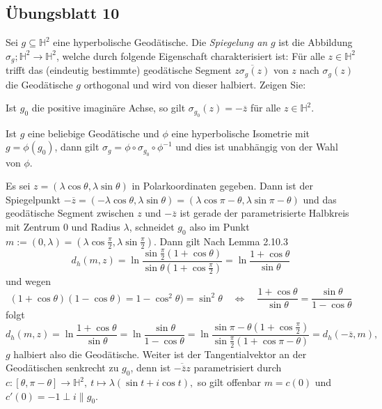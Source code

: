 \documentclass[11pt]{book}
\numberwithin{dummy}{section}
\theoremstyle{nonumberbreak}
\newenvironment{prob}[1][]{\ifthenelse{\equal{#1}{}}{\problem}{\problem[#1]}\rm}{\endproblem}
\newenvironment{sol}[1][]{\ifthenelse{\equal{#1}{}}{\solution}{\solution[#1]}\rm}{\endsolution}
\newcommand{\He}{\mathbb{H}}
\newcommand{\la}{\longrightarrow}
\begin{document}
\begin{spacing}{1.4}
\titlespacing*{\section}{-16.5pt}{0pt}{20pt}
\renewcommand*\thesection{}
\section{Übungsblatt 10} %
\renewcommand*\thesection{\arabic{section}}



\begin{prob}    %

Sei $g \subseteq \He^2$ eine hyperbolische Geodätische. Die \textit{Spiegelung an} $g$ ist die Abbildung $\sigma_g; \He^2 \la \He^2$, welche durch folgende Eigenschaft charakterisiert ist: Für alle $z \in \He^2$ trifft das (eindeutig bestimmte) geodätische Segment $\overline{z \sigma_g(z)}$ von $z$ nach $\sigma_g(z)$ die Geodätische $g$ orthogonal und wird von dieser halbiert. Zeigen Sie:
\begin{compactenum}
\item Ist $g_0$ die positive imaginäre Achse, so gilt $\sigma_{g_0}(z)=-\overline{z}$ für alle $z \in \He^2$.
\item Ist $g$ eine beliebige Geodätische und $\phi$ eine hyperbolische Isometrie mit $g=\phi(g_0)$, dann gilt $\sigma_g= \phi \circ \sigma_{g_0}\circ \phi^{-1}$ und dies ist unabhängig von der Wahl von $\phi$.
\end{compactenum}


\begin{sol}
\begin{compactenum}
\item Es sei $z=(\lambda \cos \theta, \lambda \sin \theta)$ in Polarkoordinaten gegeben. Dann ist der Spiegelpunkt $-\overline{z} = (-\lambda \cos \theta, \lambda \sin \theta)= (\lambda \cos \pi- \theta, \lambda \sin \pi-\theta)$ und das geodätische Segment zwischen $z$ und $-\overline{z}$ ist gerade der parametrisierte Halbkreis mit Zentrum $0$ und Radius $\lambda$, schneidet $g_0$ also im Punkt $m:=(0,\lambda) = \left(\lambda \cos \frac{\pi}{2}, \lambda \sin \frac{\pi}{2}\right)$. Dann gilt Nach Lemma 2.10.3
$$d_h(m,z)=\ln \frac{\sin \frac{\pi}{2} \left( 1 + \cos \theta\right)}{\sin \theta \left( 1 + \cos \frac{\pi}{2}\right)} = \ln \frac{1 + \cos \theta}{\sin \theta}$$
und wegen 
$$(1+\cos \theta)(1-\cos\theta) = 1 - \cos^2\theta) = \sin^2\theta \quad \Longleftrightarrow \quad \frac{1+\cos\theta}{\sin\theta} = \frac{\sin \theta}{1-\cos \theta}$$
folgt
$$d_h(m,z)= \ln \frac{1+\cos\theta}{\sin \theta} = \ln \frac{\sin \theta}{1-\cos \theta}  = \ln \frac{ \sin \pi-\theta \left(1+\cos \frac{\pi}{2}\right)}{\sin \frac{\pi}{2} \left( 1+ \cos \pi-\theta\right)}=d_h(-\overline{z},m),$$
$g$ halbiert also die Geodätische. Weiter ist der Tangentialvektor an der Geodätischen senkrecht zu $g_0$, denn ist $\overline{-\overline{z} z}$ parametrisiert durch 
$c:[\theta,\pi-\theta] \la \He^2,\ t \mapsto \lambda ( \sin t + i \cos t),$
so gilt offenbar $m=c(0)$ und $c'(0)=-1 \perp i \parallel g_0$.


\end{compactenum}
\end{sol}
\end{prob}
\end{spacing}
\end{document}
